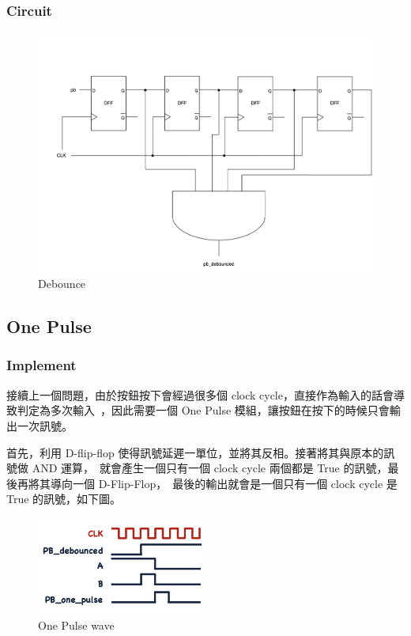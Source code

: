 \documentclass[10.5pt,compsoc,UTF8]{CjC}
\theoremstyle{mystyle}
\begin{document}
\subsubsection*{Circuit}
\begin{figure}[!h]
  \centering
  \includegraphics[width=\textwidth]{./img/Q5-Debounce.png}
  \caption{Debounce}
  \label{fig:debounce}
\end{figure}

\newpage

\subsection{One Pulse}
\subsubsection*{Implement}
接續上一個問題，由於按鈕按下會經過很多個 clock cycle，直接作為輸入的話會導致判定為多次輸入\
，因此需要一個 One Pulse 模組，讓按鈕在按下的時候只會輸出一次訊號。
\par
首先，利用 D-flip-flop 使得訊號延遲一單位，並將其反相。接著將其與原本的訊號做 AND 運算，\
就會產生一個只有一個 clock cycle 兩個都是 True 的訊號，最後再將其導向一個 D-Flip-Flop，\
最後的輸出就會是一個只有一個 clock cycle 是 True 的訊號，如下圖。

\begin{figure}[!h]
  \centering
  \includegraphics[width=0.5\textwidth]{./img/Q5-One-pulse-wave.png}
  \caption{One Pulse wave}
  \label{fig:one-pulse-wave}
\end{figure}
\end{document}

